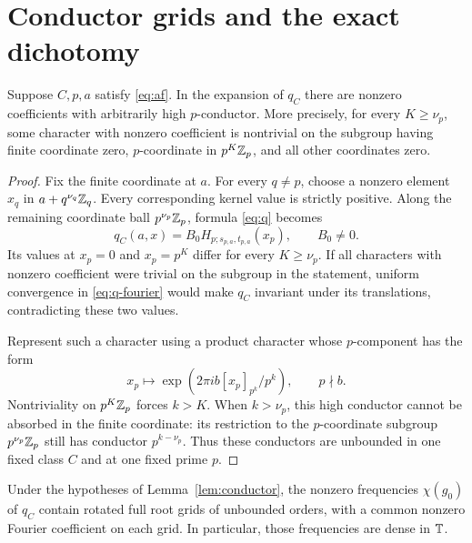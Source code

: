 \section{Conductor grids and the exact dichotomy}\label{sec:boundary}

\begin{lemma}\label{lem:conductor}
Suppose \(C,p,a\) satisfy \eqref{eq:af}. In the expansion of \(q_C\)
there are nonzero coefficients with arbitrarily high \(p\)-conductor.
More precisely, for every \(K\geq\nu_p\), some character with nonzero
coefficient is nontrivial on the subgroup having finite coordinate zero,
\(p\)-coordinate in \(p^K\mathbb Z_p\), and all other coordinates zero.
\end{lemma}

\begin{proof}
Fix the finite coordinate at \(a\). For every \(q\ne p\), choose a
nonzero element \(x_q\) in \(a+q^{\nu_q}\mathbb Z_q\).
Every corresponding kernel value is strictly positive. Along the
remaining coordinate ball \(p^{\nu_p}\mathbb Z_p\), formula \eqref{eq:q}
becomes
\[
q_C(a,x)=B_0H_{p;s_{p,a},t_{p,a}}(x_p),\qquad B_0\ne0.
\]
Its values at \(x_p=0\) and \(x_p=p^K\) differ for every
\(K\geq\nu_p\). If all characters with nonzero coefficient were trivial
on the subgroup in the statement, uniform convergence in
\eqref{eq:q-fourier} would make \(q_C\) invariant under its translations,
contradicting these two values.

Represent such a character using a product character whose
\(p\)-component has the form
\[
x_p\longmapsto
\exp(2\pi i b[x_p]_{p^k}/p^k),\qquad p\nmid b.
\]
Nontriviality on \(p^K\mathbb Z_p\) forces \(k>K\). When \(k>\nu_p\), this
high conductor cannot be absorbed in the finite coordinate: its
restriction to the \(p\)-coordinate subgroup \(p^{\nu_p}\mathbb Z_p\)
still has conductor \(p^{k-\nu_p}\). Thus these conductors are
unbounded in one fixed class \(C\) and at one fixed prime \(p\).
\end{proof}

\begin{lemma}\label{lem:grids}
Under the hypotheses of Lemma~\ref{lem:conductor}, the nonzero
frequencies \(\chi(g_0)\) of \(q_C\) contain rotated full root grids of
unbounded orders, with a common nonzero Fourier coefficient on each grid.
In particular, those frequencies are dense in \(\mathbb T\).
\end{lemma}

